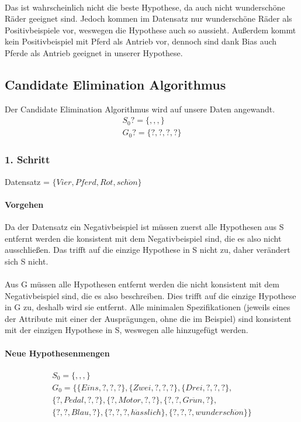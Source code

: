 \documentclass[a4paper]{article}
\begin{document}
\paragraph{}
Das ist wahrscheinlich nicht die beste Hypothese, da auch nicht wunderschöne Räder geeignet sind. Jedoch kommen im Datensatz nur wunderschöne Räder als Positivbeispiele vor, weswegen die Hypothese auch so aussieht. Außerdem kommt kein Positivbeispiel mit Pferd als Antrieb vor, dennoch sind dank Bias auch Pferde als Antrieb geeignet in unserer Hypothese.

\subsection{Candidate Elimination Algorithmus}
Der Candidate Elimination Algorithmus wird auf unsere Daten angewandt.
\begin{align*}
	S_0 ?= \{,,,\} \\
	G_0 ?= \{?,?,?,?\}
\end{align*}

\subsubsection{1. Schritt}
Datensatz = $ \{Vier, Pferd, Rot, sch\ddot{o}n\} $
\paragraph{Vorgehen}
Da der Datensatz ein Negativbeispiel ist müssen zuerst alle Hypothesen aus S entfernt werden die konsistent mit dem Negativbeispiel sind, die es also nicht ausschließen. Das trifft auf die einzige Hypothese in S nicht zu, daher verändert sich S nicht.
\paragraph{}
Aus G müssen alle Hypothesen entfernt werden die nicht konsistent mit dem Negativbeispiel sind, die es also beschreiben. Dies trifft auf die einzige Hypothese in G zu, deshalb wird sie entfernt. Alle minimalen Spezifikationen (jeweils eines der Attribute mit einer der Ausprägungen, ohne die im Beispiel) sind konsistent mit der einzigen Hypothese in S, weswegen alle hinzugefügt werden.
\paragraph{Neue Hypothesenmengen}
\begin{align*}
	S_0 = \{,,,\} \\
	G_0 = \{ \{Eins,?,?,?\}, \{Zwei,?,?,?\}, \{Drei,?,?,?\}, \\
	\{?,Pedal,?,?\}, \{?,Motor,?,?\}, \{?,?,Gr\ddot{u}n,?\}, \\ 
	\{?,?,Blau,?\}, \{?,?,?,h\ddot{a}sslich\}, \{?,?,?,wundersch\ddot{o}n\} \}
\end{align*}
\end{document}

